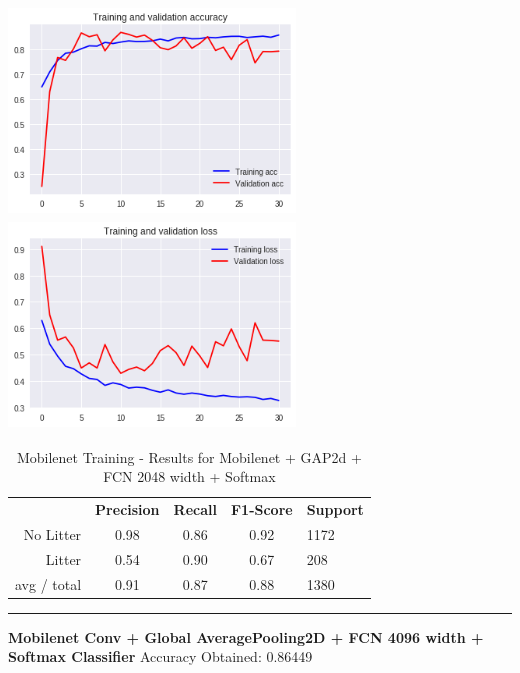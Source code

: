 \documentclass{IEEEtran}
\begin{document}
 \includegraphics[width=3in,height=2.18in]{mobile/mobilenet-img007.png} 
\includegraphics[width=3in,height=2.18in]{mobile/mobilenet-img008.png} 


\bigskip
\begin{table}[ht]
\centering
\caption{Mobilenet Training - Results for Mobilenet + GAP2d + FCN 2048 width + Softmax}
\label{mobilenet1}
\begin{tabular}{rcccl}
\textbf{}   & \textbf{Precision} & \textbf{Recall} & \textbf{F1-Score} & \textbf{Support} \\
No Litter   & 0.98 &0.86 & 0.92 & 1172 \\
Litter      & 0.54 &0.90 & 0.67 & 208 \\
avg / total & 0.91 &0.87 & 0.88 & 1380 \\
\end{tabular}
\begin{center}\noindent\rule{10cm}{0.4pt}\end{center}
\end{table}

\bigskip

\textbf{Mobilenet Conv + Global AveragePooling2D + FCN 4096 width + Softmax Classifier}\newline
Accuracy Obtained: 0.86449


\bigskip


\bigskip
\end{document}
